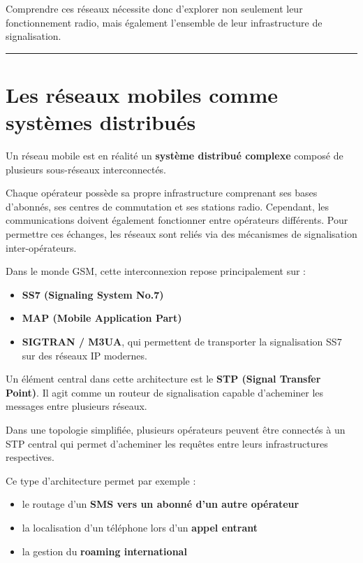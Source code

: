 \documentclass[
]{article}
\providecommand{\tightlist}{%
  \setlength{\itemsep}{0pt}\setlength{\parskip}{0pt}}
\begin{document}
Comprendre ces réseaux nécessite donc d'explorer non seulement leur
fonctionnement radio, mais également l'ensemble de leur infrastructure
de signalisation.

\begin{center}\rule{0.5\linewidth}{0.5pt}\end{center}

\section{Les réseaux mobiles comme systèmes
distribués}\label{les-ruxe9seaux-mobiles-comme-systuxe8mes-distribuuxe9s}

Un réseau mobile est en réalité un \textbf{système distribué complexe}
composé de plusieurs sous-réseaux interconnectés.

Chaque opérateur possède sa propre infrastructure comprenant ses bases
d'abonnés, ses centres de commutation et ses stations radio. Cependant,
les communications doivent également fonctionner entre opérateurs
différents. Pour permettre ces échanges, les réseaux sont reliés via des
mécanismes de signalisation inter-opérateurs.

Dans le monde GSM, cette interconnexion repose principalement sur :

\begin{itemize}
\tightlist
\item
  \textbf{SS7 (Signaling System No.7)}
\item
  \textbf{MAP (Mobile Application Part)}
\item
  \textbf{SIGTRAN / M3UA}, qui permettent de transporter la
  signalisation SS7 sur des réseaux IP modernes.
\end{itemize}

Un élément central dans cette architecture est le \textbf{STP (Signal
Transfer Point)}. Il agit comme un routeur de signalisation capable
d'acheminer les messages entre plusieurs réseaux.

Dans une topologie simplifiée, plusieurs opérateurs peuvent être
connectés à un STP central qui permet d'acheminer les requêtes entre
leurs infrastructures respectives.

Ce type d'architecture permet par exemple :

\begin{itemize}
\tightlist
\item
  le routage d'un \textbf{SMS vers un abonné d'un autre opérateur}
\item
  la localisation d'un téléphone lors d'un \textbf{appel entrant}
\item
  la gestion du \textbf{roaming international}
\end{itemize}
\end{document}
